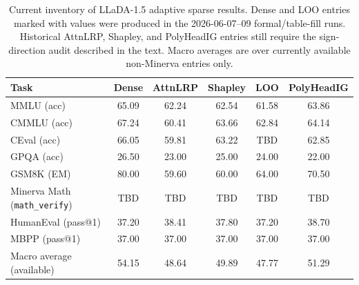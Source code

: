 \begin{table}[t]
\centering
\caption{Current inventory of LLaDA-1.5 adaptive sparse results. Dense and LOO entries marked with values were produced in the 2026-06-07--09 formal/table-fill runs. Historical AttnLRP, Shapley, and PolyHeadIG entries still require the sign-direction audit described in the text. Macro averages are over currently available non-Minerva entries only.}
\label{tab:adaptive_llada_draft}
\begin{tabular}{lccccc}
\hline
\textbf{Task} & \textbf{Dense} & \textbf{AttnLRP} & \textbf{Shapley} & \textbf{LOO} & \textbf{PolyHeadIG} \\
\hline
MMLU (acc) & 65.09 & 62.24 & 62.54 & 61.58 & 63.86 \\
CMMLU (acc) & 67.24 & 60.41 & 63.66 & 62.84 & 64.14 \\
CEval (acc) & 66.05 & 59.81 & 63.22 & TBD & 62.85 \\
GPQA (acc) & 26.50 & 23.00 & 25.00 & 24.00 & 22.00 \\
GSM8K (EM) & 80.00 & 59.60 & 60.00 & 64.00 & 70.50 \\
Minerva Math (\texttt{math\_verify}) & TBD & TBD & TBD & TBD & TBD \\
HumanEval (pass@1) & 37.20 & 38.41 & 37.80 & 37.20 & 38.70 \\
MBPP (pass@1) & 37.00 & 37.00 & 37.00 & 37.00 & 37.00 \\
Macro average (available) & 54.15 & 48.64 & 49.89 & 47.77 & 51.29 \\
\hline
\end{tabular}
\end{table}


